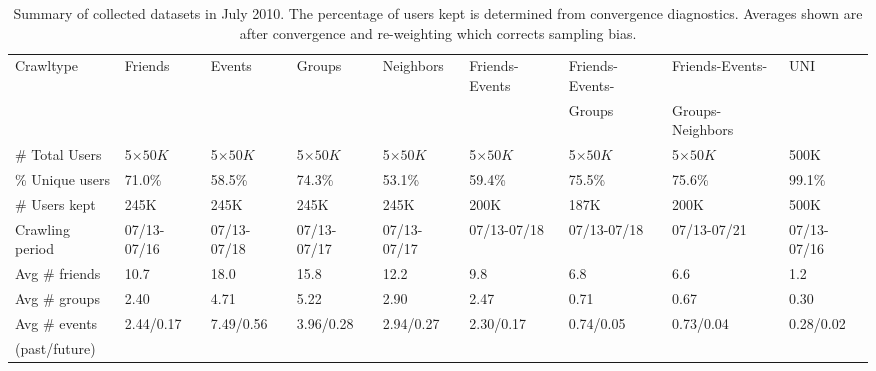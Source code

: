 \documentclass[10pt, conference]{./IEEEtran}
\begin{document}
\begin{table}[t!]
\footnotesize
\begin{center}
\begin{tabular}{|@{}l|@{}l|@{}l|@{}l|@{}l|@{}l|@{}l|@{}l|@{}l|}
\hline
Crawltype               & Friends      &  Events      & Groups       &  Neighbors    & Friends-Events & Friends-Events- &  Friends-Events-   &       UNI        \\
                        &              &              &              &               &                &     Groups      &  Groups-Neighbors  &               \\
\hline
\# Total Users          & 5$\times50K$ & 5$\times50K$ & 5$\times50K$ &  5$\times50K$ & 5$\times50K$  &  5$\times50K$   &    5$\times50K$    &         500K     \\
\% Unique users         &   71.0\%     &   58.5\%     &   74.3\%     & 53.1\%        &    59.4\%     &  75.5\%         &      75.6\%       &     99.1\%             \\
\# Users kept           &   245K       &   245K       &   245K        & 245K         &    200K       &  187K           &      200K         &     500K             \\
Crawling period         &  07/13-07/16 &  07/13-07/18 & 07/13-07/17  & 07/13-07/17   & 07/13-07/18   &  07/13-07/18    &     07/13-07/21   &    07/13-07/16   \\
\hline
Avg \# friends          &   10.7       &   18.0       &   15.8       &  12.2         &     9.8       &  6.8            &      6.6          &      1.2        \\
Avg \# groups           &   2.40       &    4.71      &   5.22        &   2.90         &    2.47       &  0.71           &     0.67          &     0.30             \\
Avg \# events           &  2.44/0.17   &    7.49/0.56 &   3.96/0.28  &  2.94/0.27    &   2.30/0.17   &  0.74/0.05      &    0.73/0.04      &   0.28/0.02                \\
 (past/future)          &              &              &              &               &               &                 &                   &                  \\
\hline
\end{tabular}
\end{center}
\vspace{-3pt}
\caption{Summary of collected datasets in July 2010. The percentage of users kept is determined from convergence diagnostics. Averages shown are after convergence and re-weighting which corrects sampling bias.}
\label{tab:datasets}
\vspace{-17pt}
\end{table}
\end{document}

